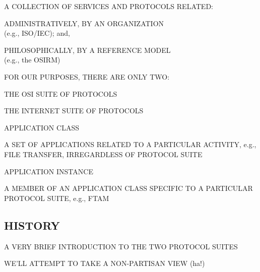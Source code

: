 \begin{bwslide}

\begin{nrtc}
\item	A COLLECTION OF SERVICES AND PROTOCOLS RELATED:
    \begin{nrtc}
    \item	ADMINISTRATIVELY, BY AN ORGANIZATION\\ (e.g., ISO/IEC); and,

    \item	PHILOSOPHICALLY, BY A REFERENCE MODEL\\ (e.g., the OSIRM)
    \end{nrtc}

\item	FOR OUR PURPOSES, THERE ARE ONLY TWO:
    \begin{nrtc}
    \item	THE OSI SUITE OF PROTOCOLS

    \item	THE INTERNET SUITE OF PROTOCOLS
    \end{nrtc}
\end{nrtc}
\end{bwslide}


\begin{bwslide}

\begin{nrtc}
\item	APPLICATION CLASS
    \begin{nrtc}
    \item	A SET OF APPLICATIONS RELATED TO A PARTICULAR ACTIVITY,
		e.g., FILE TRANSFER, IRREGARDLESS OF PROTOCOL SUITE
    \end{nrtc}

\item	APPLICATION INSTANCE
    \begin{nrtc}
    \item	A MEMBER OF AN APPLICATION CLASS SPECIFIC TO A PARTICULAR
		PROTOCOL SUITE, e.g., FTAM
    \end{nrtc}
\end{nrtc}
\end{bwslide}


\begin{bwslide}
\part*	{HISTORY}\bf

\begin{nrtc}
\item	A VERY BRIEF INTRODUCTION TO THE TWO PROTOCOL SUITES

\item	WE'LL ATTEMPT TO TAKE A NON-PARTISAN VIEW (ha!)
\end{nrtc}
\end{bwslide}


